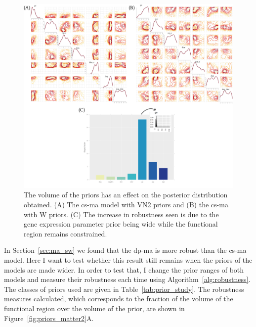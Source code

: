 \begin{figure}[h]
\centerfloat
\includegraphics[width=1.2\textwidth]{../../chapters/chapterStabilityFinder/images/priors_matter_w.png}
\caption[The volume of the priors has an effect on the posterior distribution obtained.]{ \label{fig:priors_matter}The volume of the priors has an effect on the posterior distribution obtained. (A) The \acrshort{cs-ma} model with VN2 priors and (B) the \acrshort{cs-ma} with W priors. (C) The increase in robustness seen is due to the gene expression parameter prior being wide while the functional region remains constrained.}

\end{figure}



In Section~\ref{sec:ma_sw} we found that the \acrshort{dp-ma} is more robust than the \acrshort{cs-ma} model. Here I want to test whether this result still remains when the priors of the models are made wider. In order to test that, I change the prior ranges of both models and measure their robustness each time using Algorithm~\ref{alg:robustness}. The classes of priors used are given in Table~\ref{tab:prior_study}. The robustness measures calculated, which corresponds to the fraction of the volume of the functional region over the volume of the prior, are shown in Figure~\ref{fig:priors_matter2}A. 


